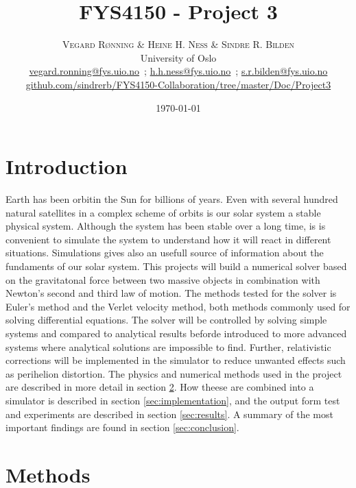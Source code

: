 \documentclass[twoside,twocolumn]{article}
\title{FYS4150 - Project 3} %
\author{%
	\textsc{Vegard R\o{}nning \& Heine H. Ness \& Sindre R. Bilden} \\[1ex] %
	\normalsize University of Oslo \\ %
	\normalsize \href{mailto:vegard.ronning@fys.uio.no}{vegard.ronning@fys.uio.no}\ ; \href{mailto:h.h.ness@fys.uio.no}{h.h.ness@fys.uio.no}\ ; \href{mailto:s.r.bilden@fys.uio.no}{s.r.bilden@fys.uio.no}\\%
	\footnotesize \href{https://github.com/sindrerb/FYS4150-Collaboration/tree/master/Doc/Project3}{github.com/sindrerb/FYS4150-Collaboration/tree/master/Doc/Project3}
}
\date{\today} %
\begin{document}
	
\maketitle

\section{Introduction}
\lettrine[nindent=0em,lines=2]{E}{}arth has been orbitin the Sun for billions of years. Even with several hundred natural satellites in a complex scheme of orbits is our solar system a stable physical system. Although the system has been stable over a long time, is is convenient to simulate the system to understand how it will react in different situations. Simulations gives also an usefull source of information about the fundaments of our solar system. This projects will build a numerical solver based on the gravitatonal force between two massive objects in combination with Newton's second and third law of motion. The methods tested for the solver is Euler's method and the Verlet velocity method, both methods commonly used for solving differential equations. The solver will be controlled by solving simple systems and compared to analytical results beforde introduced to more advanced systems where analytical solutions are impossible to find. Further, relativistic corrections will be implemented in the simulator to reduce unwanted effects such as perihelion distortion. The physics and numerical methods used in the project are described in more detail in section \ref{sec:methods}. How theese are combined into a simulator is described in section \ref{sec:implementation}, and the output form test and experiments are described in section \ref{sec:results}. A summary of the most important findings are found in section \ref{sec:conclusion}.
\section{Methods}
\label{sec:methods}

\newpage
\end{document}
